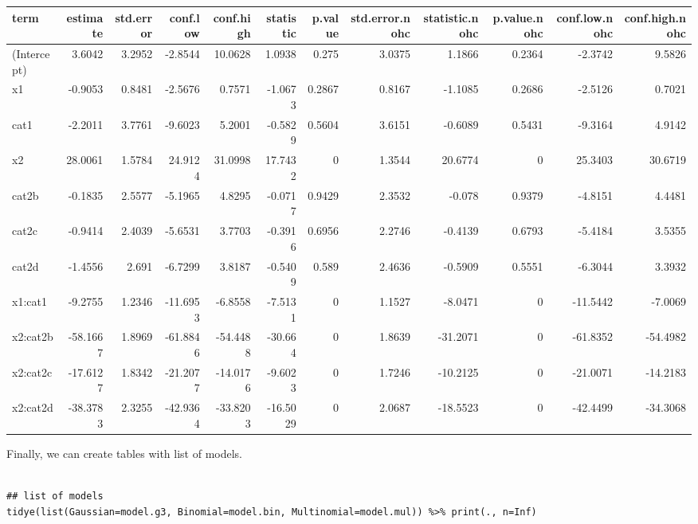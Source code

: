 \documentclass[a4paper]{article}
\begin{document}
\begin{center}
\begin{tabular}{lrrrrrrrrrrr}
term & estimate & std.error & conf.low & conf.high & statistic & p.value & std.error.nohc & statistic.nohc & p.value.nohc & conf.low.nohc & conf.high.nohc\\
\hline
(Intercept) & 3.6042 & 3.2952 & -2.8544 & 10.0628 & 1.0938 & 0.275 & 3.0375 & 1.1866 & 0.2364 & -2.3742 & 9.5826\\
x1 & -0.9053 & 0.8481 & -2.5676 & 0.7571 & -1.0673 & 0.2867 & 0.8167 & -1.1085 & 0.2686 & -2.5126 & 0.7021\\
cat1 & -2.2011 & 3.7761 & -9.6023 & 5.2001 & -0.5829 & 0.5604 & 3.6151 & -0.6089 & 0.5431 & -9.3164 & 4.9142\\
x2 & 28.0061 & 1.5784 & 24.9124 & 31.0998 & 17.7432 & 0 & 1.3544 & 20.6774 & 0 & 25.3403 & 30.6719\\
cat2b & -0.1835 & 2.5577 & -5.1965 & 4.8295 & -0.0717 & 0.9429 & 2.3532 & -0.078 & 0.9379 & -4.8151 & 4.4481\\
cat2c & -0.9414 & 2.4039 & -5.6531 & 3.7703 & -0.3916 & 0.6956 & 2.2746 & -0.4139 & 0.6793 & -5.4184 & 3.5355\\
cat2d & -1.4556 & 2.691 & -6.7299 & 3.8187 & -0.5409 & 0.589 & 2.4636 & -0.5909 & 0.5551 & -6.3044 & 3.3932\\
x1:cat1 & -9.2755 & 1.2346 & -11.6953 & -6.8558 & -7.5131 & 0 & 1.1527 & -8.0471 & 0 & -11.5442 & -7.0069\\
x2:cat2b & -58.1667 & 1.8969 & -61.8846 & -54.4488 & -30.664 & 0 & 1.8639 & -31.2071 & 0 & -61.8352 & -54.4982\\
x2:cat2c & -17.6127 & 1.8342 & -21.2077 & -14.0176 & -9.6023 & 0 & 1.7246 & -10.2125 & 0 & -21.0071 & -14.2183\\
x2:cat2d & -38.3783 & 2.3255 & -42.9364 & -33.8203 & -16.5029 & 0 & 2.0687 & -18.5523 & 0 & -42.4499 & -34.3068\\
\end{tabular}
\end{center}

Finally, we can create tables with list of models.

\lstset{numbers=left,language=r,label= ,caption= ,captionpos=b}
\begin{lstlisting}

## list of models
tidye(list(Gaussian=model.g3, Binomial=model.bin, Multinomial=model.mul)) %>% print(., n=Inf)

\end{lstlisting}
\end{document}
